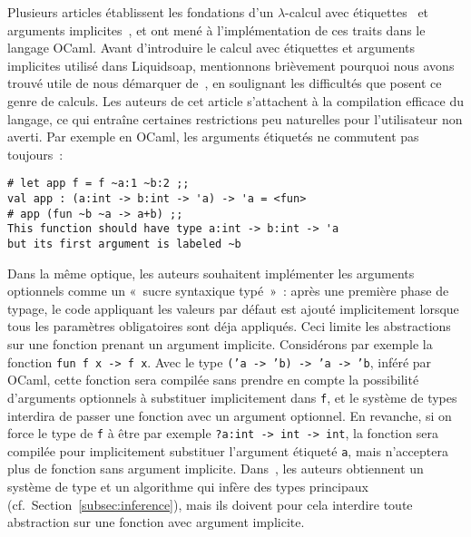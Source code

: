 \documentclass[twoside]{article}
\newcommand{\liquidsoap}{Liquidsoap}
\newcommand{\cf}{cf.~}
\theoremstyle{plain}
\theoremstyle{definition}
\theoremstyle{remark}
\begin{document}
Plusieurs articles établissent les fondations d'un $\lambda$-calcul avec
étiquettes~\cite{ait-garrigue:label} et arguments
implicites~\cite{furuse-garrigue:labelopt}, et ont mené à l'implémentation de ces
traits dans le langage OCaml. Avant d'introduire le calcul avec étiquettes et
arguments implicites utilisé dans \liquidsoap{}, mentionnons brièvement pourquoi
nous avons trouvé utile de nous démarquer de~\cite{furuse-garrigue:labelopt}, en
soulignant les difficultés que posent ce genre de calculs. Les auteurs de cet
article s'attachent à la compilation efficace du langage, ce qui entraîne
certaines restrictions peu naturelles pour l'utilisateur non averti. Par exemple
en OCaml, les arguments étiquetés ne commutent pas toujours~:
\begin{verbatim}
# let app f = f ~a:1 ~b:2 ;;
val app : (a:int -> b:int -> 'a) -> 'a = <fun>
# app (fun ~b ~a -> a+b) ;;
This function should have type a:int -> b:int -> 'a
but its first argument is labeled ~b
\end{verbatim}
Dans la même optique, les auteurs souhaitent implémenter les arguments
optionnels comme un «~sucre syntaxique typé~»~: après une première phase de
typage, le code appliquant les valeurs par défaut est ajouté implicitement
lorsque tous les paramètres obligatoires sont déja appliqués. Ceci limite les
abstractions sur une fonction prenant un argument implicite.
Considérons par exemple la fonction \texttt{fun f x -> f x}.
Avec le type \texttt{('a -> 'b) -> 'a -> 'b}, inféré par OCaml,
cette fonction sera compilée sans prendre en compte la possibilité 
d'arguments optionnels à substituer implicitement dans \verb.f.,
et le système de types interdira de passer une fonction avec un argument
optionnel.
En revanche, si on force le type de \verb.f. à être par exemple
\verb.?a:int -> int -> int., la fonction sera compilée pour 
implicitement substituer l'argument étiqueté \verb.a., mais n'acceptera plus de 
fonction sans argument implicite.
Dans~\cite{furuse-garrigue:labelopt}, les auteurs obtiennent un système
de type et un algorithme qui infère des types principaux
(\cf Section~\ref{subsec:inference}),
mais ils doivent pour cela interdire toute abstraction sur une fonction 
avec argument implicite.
\end{document}
